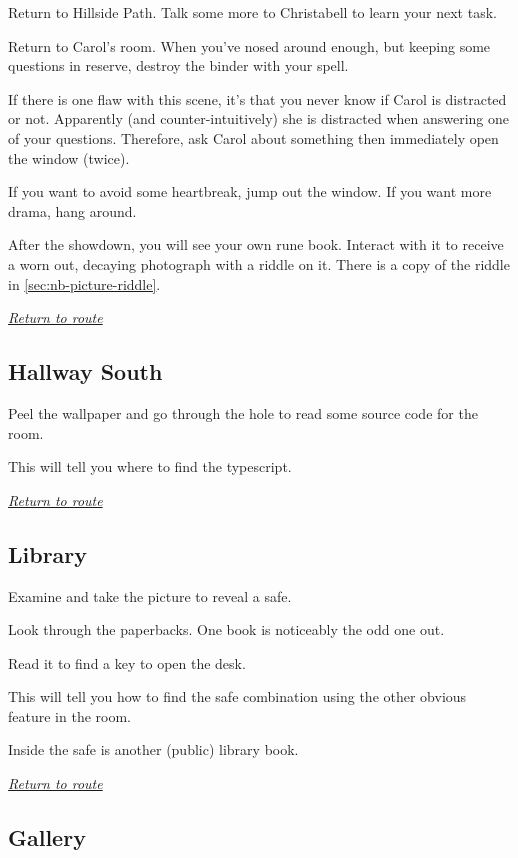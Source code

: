 \documentclass[a5paper]{extarticle}
\begin{document}
Return to Hillside Path.
Talk some more to Christabell to learn your next task.

Return to Carol's room.
When you've nosed around enough, but keeping some questions in reserve,
destroy the binder with your spell.

If there is one flaw with this scene, it's that you never know if Carol is
distracted or not. Apparently (and counter-intuitively) she is distracted
when answering one of your questions. Therefore, ask Carol about something
then immediately open the window (twice).

If you want to avoid some heartbreak, jump out the window. If you want more drama,
hang around.

After the showdown, you will see your own rune book.
Interact with it to receive a worn out, decaying photograph with a riddle on it.
There is a copy of the riddle in \cref{sec:nb-picture-riddle}.

\hyperref[sec:route-5]{\emph{Return to route}}

\newpage
\subsection{Hallway South}\label{sec:sol-Hallway-South}

Peel the wallpaper and go through the hole to read some source code for the room.

This will tell you where to find the typescript.

\hyperref[sec:route-5]{\emph{Return to route}}

\newpage
\subsection{Library}\label{sec:sol-Library}

Examine and take the picture to reveal a safe.

Look through the paperbacks. One book is noticeably the odd one out.

Read it to find a key to open the desk.

This will tell you how to find the safe combination using the other obvious feature in the room.

Inside the safe is another (public) library book.

\hyperref[sec:route-5]{\emph{Return to route}}

\newpage
\subsection{Gallery}\label{sec:sol-Gallery}
\end{document}
